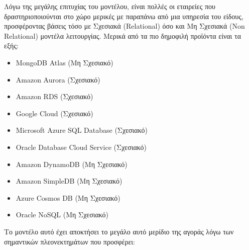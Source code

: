 \documentclass{article}
\begin{document}
Λόγω της μεγάλης επιτυχίας του μοντέλου, είναι πολλές οι εταιρείες που δραστηριοποιούνται στο χώρο μερικές με παραπάνω από μια υπηρεσία του είδους, προσφέροντας βάσεις τόσο με Σχεσιακά (Relational) όσο και Μη Σχεσιακά (Non Relational) μοντέλα λειτουργίας. Μερικά από τα πιο δημοφιλή προϊόντα είναι τα εξής:
\begin{itemize}
\item MongoDB Atlas (Μη Σχεσιακό)
\item Amazon Aurora (Σχεσιακό)
\item Amazon RDS (Σχεσιακό)
\item Google Cloud (Σχεσιακό)
\item Microsoft Azure SQL Database (Σχεσιακό)
\item Oracle Database Cloud Service (Σχεσιακό)
\item Amazon DynamoDB (Μη Σχεσιακό)
\item Amazon SimpleDB (Μη Σχεσιακό)
\item Azure Cosmos DB (Μη Σχεσιακό)
\item Oracle NoSQL (Μη Σχεσιακό)
\end{itemize}
Το μοντέλο αυτό έχει αποκτήσει το μεγάλο αυτό μερίδιο της αγοράς λόγω των σημαντικών πλεονεκτημάτων που προσφέρει:
\end{document}
